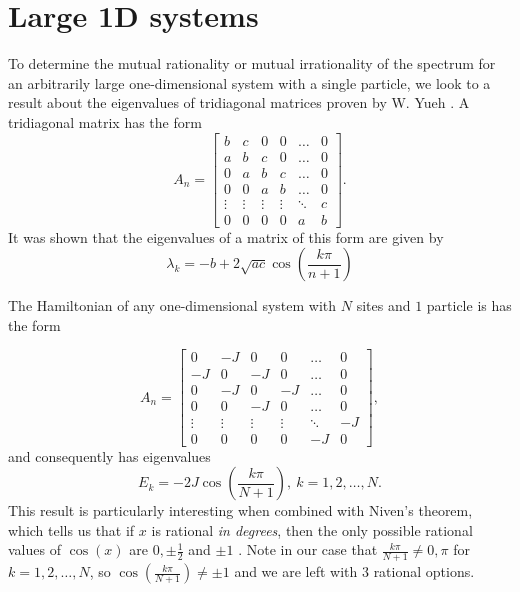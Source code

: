 \documentclass[a4paper,10pt]{article}
\begin{document}
\section{Large 1D systems}
To determine the mutual rationality or mutual irrationality of the spectrum for an arbitrarily large one-dimensional system with a single particle, we look to a result about the eigenvalues
of tridiagonal matrices proven by W. Yueh \cite{Yueh2006}. A tridiagonal matrix has the form
\begin{equation}
 A_n= \begin{bmatrix}
 b & c & 0 & 0&\dots & 0\\
 a & b & c & 0&\dots & 0\\
 0 & a & b & c& \dots & 0\\
 0 & 0 & a & b& \dots & 0\\
 \vdots & \vdots & \vdots&\vdots & \ddots & c\\
 0 & 0 & 0 & 0 & a & b
 \end{bmatrix}.
\end{equation}
It was shown that the eigenvalues of a matrix of this form are given by
\begin{equation}
 \lambda_k=-b+2\sqrt{ac}\cos\left(\frac{k\pi}{n+1}\right)
\end{equation}

The Hamiltonian of any one-dimensional system with $N$ sites and $1$ particle is has the form

\begin{equation}
 A_n= \begin{bmatrix}
 0 & -J & 0 & 0&\dots & 0\\
 -J & 0 & -J & 0&\dots & 0\\
 0 & -J & 0 & -J& \dots & 0\\
 0 & 0 & -J & 0& \dots & 0\\
 \vdots & \vdots & \vdots&\vdots & \ddots & -J\\
 0 & 0 & 0 & 0 & -J & 0
 \end{bmatrix},
\end{equation}
and consequently has eigenvalues
\begin{equation}
\label{1D_eigenvalues}
 E_k=-2J\cos\left(\frac{k\pi}{N+1}\right), \ k=1,2,\dots,N.
\end{equation}
This result is particularly interesting when combined with Niven's theorem, which tells us that if $x$ is
rational \textit{in degrees}, then the only possible rational values of $\cos(x)$ are $0, \pm \frac{1}{2}$ and $\pm 1$ \cite{Niven2005}. Note in our case that $\frac{k\pi}{N+1}\neq 0, \pi$
for $k=1,2,\dots,N$, so $\cos(\frac{k\pi}{N+1})\neq\pm1$ and we are left with $3$ rational options.
\end{document}
